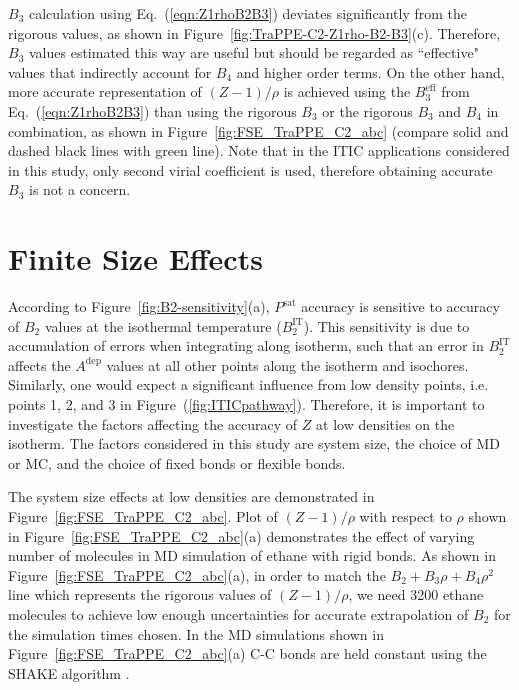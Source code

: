 \documentclass[5p,times]{elsarticle}
\begin{document}
$B_3$ calculation using Eq.~(\ref{eqn:Z1rhoB2B3}) deviates significantly from the rigorous values, as shown in Figure~\ref{fig:TraPPE-C2-Z1rho-B2-B3}(c). Therefore, $B_3$ values estimated this way are useful but should be regarded as ``effective" values that indirectly account for $B_4$ and higher order terms. On the other hand, more accurate representation of $(Z-1)/\rho$ is achieved using the $B_3^\mathrm{eff}$ from Eq.~(\ref{eqn:Z1rhoB2B3}) than using the rigorous $B_3$ or the rigorous $B_3$ and $B_4$ in combination, as shown in Figure~\ref{fig:FSE_TraPPE_C2_abc} (compare solid and dashed black lines with green line). Note that in the ITIC applications considered in this study, only second virial coefficient is used, therefore obtaining accurate $B_3$ is not a concern.


\section{Finite Size Effects}\label{sec:FSE}
According to Figure~\ref{fig:B2-sensitivity}(a), $P^{\mathrm{sat}}$ accuracy is sensitive to accuracy of $B_2$ values at the isothermal temperature ($B_2^{\mathrm{IT}}$). This sensitivity is due to accumulation of errors when integrating along isotherm, such that an error in $B_2^{\mathrm{IT}}$ affects the $A^{\mathrm{dep}}$ values at all other points along the isotherm and isochores. Similarly, one would expect a significant influence from low density points, i.e. points 1, 2, and 3 in Figure~(\ref{fig:ITICpathway}). Therefore, it is important to investigate the factors affecting the accuracy of $Z$ at low densities on the isotherm. The factors considered in this study are system size, the choice of MD or MC, and the choice of fixed bonds or flexible bonds. 

The system size effects at low densities are demonstrated in Figure~\ref{fig:FSE_TraPPE_C2_abc}. Plot of $(Z-1)/\rho$ with respect to $\rho$ shown in Figure~\ref{fig:FSE_TraPPE_C2_abc}(a) demonstrates the effect of varying number of molecules in MD simulation of ethane with rigid bonds. As shown in Figure~\ref{fig:FSE_TraPPE_C2_abc}(a), in order to match the $B_2+B_3 \rho+B_4 \rho^2$ line which represents the rigorous values of $(Z-1)/\rho$, we need 3200 ethane molecules to achieve low enough uncertainties for accurate extrapolation of $B_2$ for the simulation times chosen. In the MD simulations shown in Figure~\ref{fig:FSE_TraPPE_C2_abc}(a) C-C bonds are held constant using the SHAKE algorithm \cite{Ryckaert1977}. 
\end{document}
